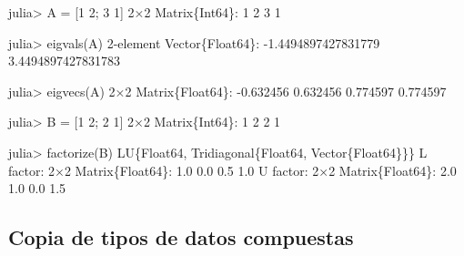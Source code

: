 \documentclass[
  letterpaper,
  DIV=11,
  numbers=noendperiod]{scrreprt}
\newenvironment{Shaded}{\begin{snugshade}}{\end{snugshade}}
\newcommand{\DataTypeTok}[1]{\textcolor[rgb]{0.68,0.00,0.00}{#1}}
\newcommand{\FloatTok}[1]{\textcolor[rgb]{0.68,0.00,0.00}{#1}}
\newcommand{\FunctionTok}[1]{\textcolor[rgb]{0.28,0.35,0.67}{#1}}
\newcommand{\NormalTok}[1]{\textcolor[rgb]{0.00,0.23,0.31}{#1}}
\newcommand{\OperatorTok}[1]{\textcolor[rgb]{0.37,0.37,0.37}{#1}}
\begin{document}
\begin{Shaded}
\begin{Highlighting}[]
\NormalTok{julia}\OperatorTok{\textgreater{}}\NormalTok{ A }\OperatorTok{=}\NormalTok{ [}\FloatTok{1} \FloatTok{2}\NormalTok{; }\FloatTok{3} \FloatTok{1}\NormalTok{]}
\FloatTok{2}\OperatorTok{×}\FloatTok{2} \DataTypeTok{Matrix}\NormalTok{\{}\DataTypeTok{Int64}\NormalTok{\}}\OperatorTok{:}
 \FloatTok{1}  \FloatTok{2}
 \FloatTok{3}  \FloatTok{1}

\NormalTok{julia}\OperatorTok{\textgreater{}} \FunctionTok{eigvals}\NormalTok{(A)}
\FloatTok{2}\OperatorTok{{-}}\NormalTok{element }\DataTypeTok{Vector}\NormalTok{\{}\DataTypeTok{Float64}\NormalTok{\}}\OperatorTok{:}
 \OperatorTok{{-}}\FloatTok{1.4494897427831779}
  \FloatTok{3.4494897427831783}

\NormalTok{julia}\OperatorTok{\textgreater{}} \FunctionTok{eigvecs}\NormalTok{(A)}
\FloatTok{2}\OperatorTok{×}\FloatTok{2} \DataTypeTok{Matrix}\NormalTok{\{}\DataTypeTok{Float64}\NormalTok{\}}\OperatorTok{:}
 \OperatorTok{{-}}\FloatTok{0.632456}  \FloatTok{0.632456}
  \FloatTok{0.774597}  \FloatTok{0.774597}

\NormalTok{julia}\OperatorTok{\textgreater{}}\NormalTok{ B }\OperatorTok{=}\NormalTok{ [}\FloatTok{1} \FloatTok{2}\NormalTok{; }\FloatTok{2} \FloatTok{1}\NormalTok{]}
\FloatTok{2}\OperatorTok{×}\FloatTok{2} \DataTypeTok{Matrix}\NormalTok{\{}\DataTypeTok{Int64}\NormalTok{\}}\OperatorTok{:}
 \FloatTok{1}  \FloatTok{2}
 \FloatTok{2}  \FloatTok{1}

\NormalTok{julia}\OperatorTok{\textgreater{}} \FunctionTok{factorize}\NormalTok{(B)}
\NormalTok{LU\{}\DataTypeTok{Float64}\NormalTok{, Tridiagonal\{}\DataTypeTok{Float64}\NormalTok{, }\DataTypeTok{Vector}\NormalTok{\{}\DataTypeTok{Float64}\NormalTok{\}\}\}}
\NormalTok{L factor}\OperatorTok{:}
\FloatTok{2}\OperatorTok{×}\FloatTok{2} \DataTypeTok{Matrix}\NormalTok{\{}\DataTypeTok{Float64}\NormalTok{\}}\OperatorTok{:}
 \FloatTok{1.0}  \FloatTok{0.0}
 \FloatTok{0.5}  \FloatTok{1.0}
\NormalTok{U factor}\OperatorTok{:}
\FloatTok{2}\OperatorTok{×}\FloatTok{2} \DataTypeTok{Matrix}\NormalTok{\{}\DataTypeTok{Float64}\NormalTok{\}}\OperatorTok{:}
 \FloatTok{2.0}  \FloatTok{1.0}
 \FloatTok{0.0}  \FloatTok{1.5}
\end{Highlighting}
\end{Shaded}

\hypertarget{copia-de-tipos-de-datos-compuestas}{%
\subsection{Copia de tipos de datos
compuestas}\label{copia-de-tipos-de-datos-compuestas}}
\end{document}
